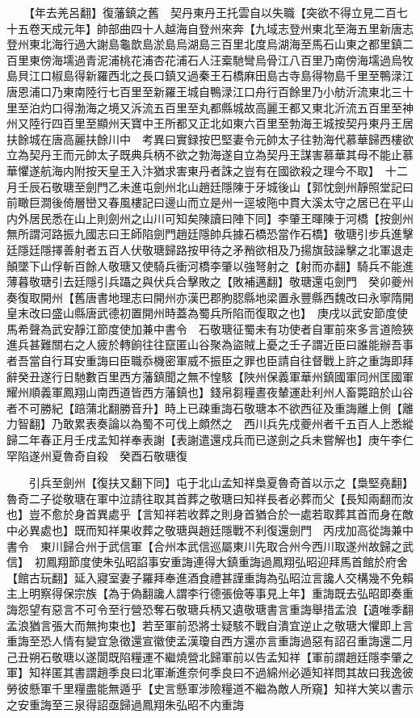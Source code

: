 　　【年去羌呂翻】復藩鎮之舊　契丹東丹王托雲自以失職【突欲不得立見二百七十五卷天成元年】帥部曲四十人越海自登州來奔【九域志登州東北至海五里新唐志登州東北海行過大謝島龜歆島淤島烏湖島三百里北度烏湖海至馬石山東之都里鎮二百里東傍海壖過青泥浦桃花浦杏花浦石人汪槖馳彎烏骨江八百里乃南傍海壖過烏牧島貝江口椒島得新羅西北之長口鎮又過秦王石橋麻田島古寺島得物島千里至鴨渌江唐恩浦口乃東南陸行七百里至新羅王城自鴨渌江口舟行百餘里乃小舫沂流東北三十里至泊灼口得渤海之境又泝流五百里至丸都縣城故高麗王都又東北沂流五百里至神州又陸行四百里至顯州天寶中王所都又正北如東六百里至勃海王城按契丹東丹王居扶餘城在唐高麗扶餘川中　考異曰實録按巴堅妻令元帥太子往勃海代慕華歸西樓欲立為契丹王而元帥太子既典兵柄不欲之勃海遂自立為契丹王謀害慕華其母不能止慕華懼遂航海内附按天皇王入汴猶求害東丹者誅之豈有在國欲殺之理今不取】　十二月壬辰石敬瑭至劍門乙未進屯劍州北山趙廷隱陳于牙城後山【郭忱劍州靜照堂記曰前瞰巨澗後倚層巒又春風樓記曰邊山而立是州一逕坡陁中貫大溪太守之居已在平山内外居民悉在山上則劍州之山川可知矣陳讀曰陣下同】李肇王暉陳于河橋【按劍州無所謂河路振九國志曰王師陷劍門趙廷隱帥兵據石橋恐當作石橋】敬瑭引步兵進擊廷隱廷隱擇善射者五百人伏敬瑭歸路按甲待之矛矟欲相及乃揚旗鼓譟擊之北軍退走顛墜下山俘斬百餘人敬瑭又使騎兵衝河橋李肇以強弩射之【射而亦翻】騎兵不能進薄暮敬瑭引去廷隱引兵躡之與伏兵合擊敗之【敗補邁翻】敬瑭還屯劍門　癸卯夔州奏復取開州【舊唐書地理志曰開州亦漢巴郡胊䏰縣地梁置永豐縣西魏改曰永寧隋開皇末改曰盛山縣唐武德初置開州時蓋為蜀兵所陷而復取之也】　庚戌以武安節度使馬希聲為武安靜江節度使加兼中書令　石敬瑭征蜀未有功使者自軍前來多言道險狹進兵甚難關右之人疲於轉餉往往竄匿山谷聚為盜賊上憂之壬子謂近臣曰誰能辦吾事者吾當自行耳安重誨曰臣職忝機密軍威不振臣之罪也臣請自往督戰上許之重誨即拜辭癸丑遂行日馳數百里西方藩鎮聞之無不惶駭【陜州保義軍華州鎮國軍同州匡國軍耀州順義軍鳳翔山南西道皆西方藩鎮也】錢帛芻糧晝夜輦運赴利州人畜斃踣於山谷者不可勝紀【踣蒲北翻勝音升】時上已疎重誨石敬瑭本不欲西征及重誨離上側【離力智翻】乃敢累表奏論以為蜀不可伐上頗然之　西川兵先戍夔州者千五百人上悉縱歸二年春正月壬戌孟知祥奉表謝【表謝遣還戍兵而已遂劍之兵未嘗解也】庚午李仁罕陷遂州夏魯奇自殺　癸酉石敬瑭復

　　引兵至劍州【復扶又翻下同】屯于北山孟知祥梟夏魯奇首以示之【梟堅堯翻】魯奇二子從敬瑭在軍中泣請往取其首葬之敬瑭曰知祥長者必葬而父【長知兩翻而汝也】豈不愈於身首異處乎【言知祥若收葬之則身首猶合於一處若取葬其首而身在敵中必異處也】既而知祥果收葬之敬瑭與趙廷隱戰不利復還劍門　丙戌加高從誨兼中書令　東川歸合州于武信軍【合州本武信巡屬東川先取合州今西川取遂州故歸之武信】　初鳳翔節度使朱弘昭諂事安重誨連得大鎮重誨過鳳翔弘昭迎拜馬首館於府舍【館古玩翻】延入寢室妻子羅拜奉進酒食禮甚謹重誨為弘昭泣言讒人交構幾不免賴主上明察得保宗族【為于偽翻讒人謂李行德張儉等事見上年】重誨既去弘昭即奏重誨怨望有惡言不可令至行營恐奪石敬瑭兵柄又遺敬瑭書言重誨舉措孟浪【遺唯季翻孟浪猶言張大而無拘束也】若至軍前恐將士疑駭不戰自潰宜逆止之敬瑭大懼即上言重誨至恐人情有變宜急徵還宣徽使孟漢瓊自西方還亦言重誨過惡有詔召重誨還二月己丑朔石敬瑭以遂閬既陷糧運不繼燒營北歸軍前以告孟知祥【軍前謂趙廷隱李肇之軍】知祥匿其書謂趙季良曰北軍漸進奈何季良曰不過綿州必遁知祥問其故曰我逸彼勞彼懸軍千里糧盡能無遁乎【史言懸軍涉險糧道不繼為敵人所窺】知祥大笑以書示之安重誨至三泉得詔亟歸過鳳翔朱弘昭不内重誨

